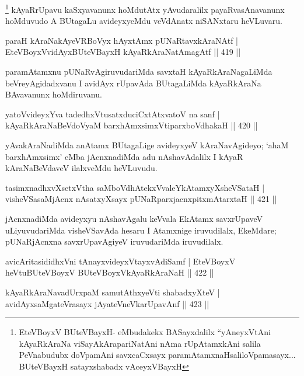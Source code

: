 \begin{artha}
\footnote{EteVBoyxV BUteVBayxH- eMbudakekx BASayxdalilx ``yAneyxVtAni kAyaRkAraNa viSayAkArapariNatAni nAma rUpAtamxkAni salila PeVnabudubx doVpamAni savxcaCxsayx paramAtamxnaH\break saliloVpamasayx... BUteVBayxH satayxshabadx vAceyxVBayxH } kAyaRrUpavu kaSxyavanunx hoMdutAtx yAvudaralilx payaRvasAnavanunx hoMduvudo A BUtagaLu avideyxyeMdu veVdAnatx niSANxtaru heVLuvaru.
\end{artha}

\begin{shl}
paraH kAraNakAyeVRBoVyx hAyxtAmx pUNaRtavxkAraNAtf |
EteVBoyxV\s vidAyxBUteVBayxH kAyaRkAraNatAmagAtf \hfill || 419 ||
\end{shl}

\begin{artha}
paramAtamxnu pUNaRvAgiruvudariMda savxtaH kAyaRkAraNagaLiMda beVreyAgidadxvanu I avidAyx rUpavAda BUtagaLiMda kAyaRkAraNa BAvavanunx hoMdiruvanu.
\end{artha}

\begin{shl}
yatoV\s videyxYva tadedhxVtusatxduciCxtAtxvatoV na sanf |
kAyaRkAraNaBeVdoV\s yaM barxhAmxsimxVtiparxboVdhakaH \hfill || 420 ||
\end{shl}

\begin{artha}
yAvakAraNadiMda anAtamx BUtagaLige avideyxyeV kAraNavAgideyo; `ahaM barxhAmxsimx' eMba jAcnxnadiMda adu nAshavAdalilx I kAyaR kAraNaBeVdaveV ilalxveMdu heVLuvudu.
\end{artha}

\begin{shl}
tasimxnadhxvXsetxV\s tha saMboVdhAtekxVvaleYkAtamxyXsheVSataH |
visheVSasaMjAcnx nAsatxyXsayx pUNaRparxjacnxpitxmAtarxtaH \hfill || 421 ||
\end{shl}

\begin{artha}
jAcnxnadiMda avideyxyu nAshavAgalu keVvala EkAtamx savxrUpaveV uLiyuvudariMda visheVSavAda hesaru I Atamxnige iruvudilalx, EkeMdare; pUNaRjAcnxna savxrUpavAgiyeV iruvudariMda iruvudilalx.
\end{artha}

\begin{shl}
avicAritasididhxVni tAnayxvideyxVtayxvAdiSamf |
EteVBoyxV heVtuBUteVBoyxV BUteVBoyxV\s kAyaRkAraNaH \hfill || 422 ||
\end{shl}
\begin{shl}
kAyaRkAraNavadUrxpaM samutAthxyeVti shabadxyXteV |
avidAyxsaMgateVrasayx jAyateV\s neVkarUpavAnf \hfill || 423 ||
\end{shl}

